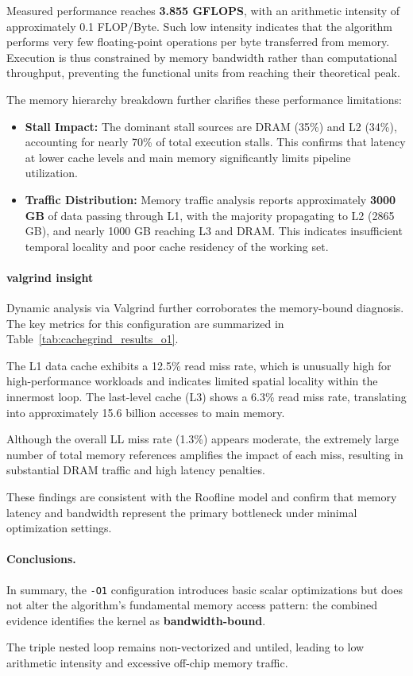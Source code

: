 Measured performance reaches \textbf{3.855 GFLOPS}, with an arithmetic intensity of approximately 0.1 FLOP/Byte. Such low intensity indicates that the algorithm performs very few floating-point operations per byte transferred from memory. Execution is thus constrained by memory bandwidth rather than computational throughput, preventing the functional units from reaching their theoretical peak.

The memory hierarchy breakdown further clarifies these performance limitations:

\begin{itemize}
    \item \textbf{Stall Impact:} The dominant stall sources are DRAM (35\%) and L2 (34\%), accounting for nearly 70\% of total execution stalls. This confirms that latency at lower cache levels and main memory significantly limits pipeline utilization.
    \item \textbf{Traffic Distribution:} Memory traffic analysis reports approximately \textbf{3000 GB} of data passing through L1, with the majority propagating to L2 (2865 GB), and nearly 1000 GB reaching L3 and DRAM. This indicates insufficient temporal locality and poor cache residency of the working set.
\end{itemize}

\paragraph{valgrind insight}
Dynamic analysis via Valgrind further corroborates the memory-bound diagnosis. The key metrics for this configuration are summarized in Table~\ref{tab:cachegrind_results_o1}.




The L1 data cache exhibits a 12.5\% read miss rate, which is unusually high for high-performance workloads and indicates limited spatial locality within the innermost loop. 
The last-level cache (L3) shows a 6.3\% read miss rate, translating into approximately 15.6 billion accesses to main memory.

Although the overall LL miss rate (1.3\%) appears moderate, the extremely large number of total memory references amplifies the impact of each miss, resulting in substantial DRAM traffic and high latency penalties.

These findings are consistent with the Roofline model and confirm that memory latency and bandwidth represent the primary bottleneck under minimal optimization settings.

\paragraph{Conclusions. }
In summary, the \texttt{-O1} configuration introduces basic scalar optimizations but does not alter the algorithm's fundamental memory access pattern: the combined evidence identifies the kernel as \textbf{bandwidth-bound}.

The triple nested loop remains non-vectorized and untiled, leading to low arithmetic intensity and excessive off-chip memory traffic.

